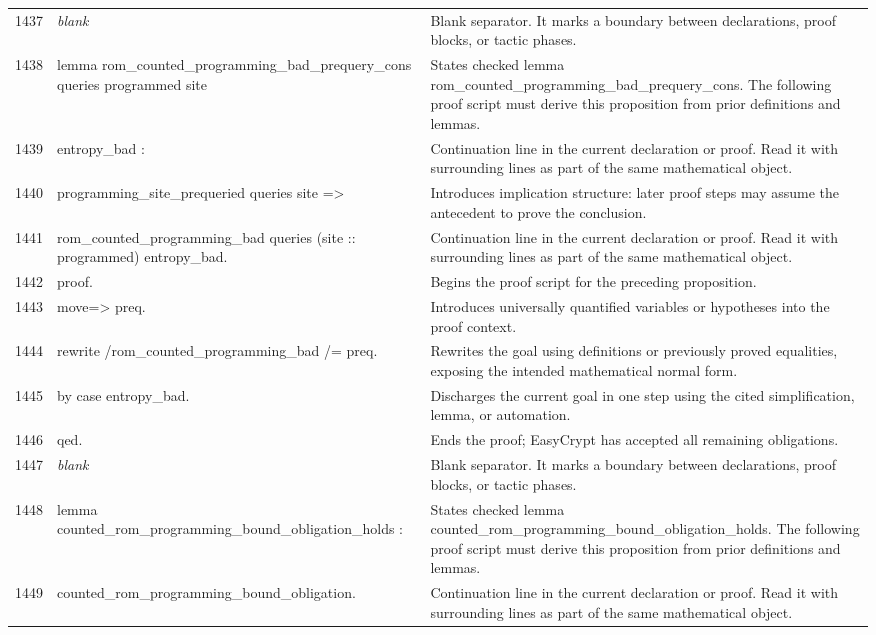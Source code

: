 \documentclass[10pt]{article}
\begin{document}
\begin{longtable}{r L{0.53\textwidth} L{0.37\textwidth}}
1437 & {\ttfamily\scriptsize \emph{blank}} & Blank separator.  It marks a boundary between declarations, proof blocks, or tactic phases. \\
1438 & {\ttfamily\scriptsize lemma rom\_counted\_programming\_bad\_prequery\_cons queries programmed site} & States checked lemma rom\_counted\_programming\_bad\_prequery\_cons.  The following proof script must derive this proposition from prior definitions and lemmas. \\
1439 & {\ttfamily\scriptsize   entropy\_bad :} & Continuation line in the current declaration or proof.  Read it with surrounding lines as part of the same mathematical object. \\
1440 & {\ttfamily\scriptsize   programming\_site\_prequeried queries site =>} & Introduces implication structure: later proof steps may assume the antecedent to prove the conclusion. \\
1441 & {\ttfamily\scriptsize   rom\_counted\_programming\_bad queries (site :: programmed) entropy\_bad.} & Continuation line in the current declaration or proof.  Read it with surrounding lines as part of the same mathematical object. \\
1442 & {\ttfamily\scriptsize proof.} & Begins the proof script for the preceding proposition. \\
1443 & {\ttfamily\scriptsize move=> preq.} & Introduces universally quantified variables or hypotheses into the proof context. \\
1444 & {\ttfamily\scriptsize rewrite /rom\_counted\_programming\_bad /= preq.} & Rewrites the goal using definitions or previously proved equalities, exposing the intended mathematical normal form. \\
1445 & {\ttfamily\scriptsize by case entropy\_bad.} & Discharges the current goal in one step using the cited simplification, lemma, or automation. \\
1446 & {\ttfamily\scriptsize qed.} & Ends the proof; EasyCrypt has accepted all remaining obligations. \\
1447 & {\ttfamily\scriptsize \emph{blank}} & Blank separator.  It marks a boundary between declarations, proof blocks, or tactic phases. \\
1448 & {\ttfamily\scriptsize lemma counted\_rom\_programming\_bound\_obligation\_holds :} & States checked lemma counted\_rom\_programming\_bound\_obligation\_holds.  The following proof script must derive this proposition from prior definitions and lemmas. \\
1449 & {\ttfamily\scriptsize   counted\_rom\_programming\_bound\_obligation.} & Continuation line in the current declaration or proof.  Read it with surrounding lines as part of the same mathematical object. \\

\end{longtable}
\end{document}
